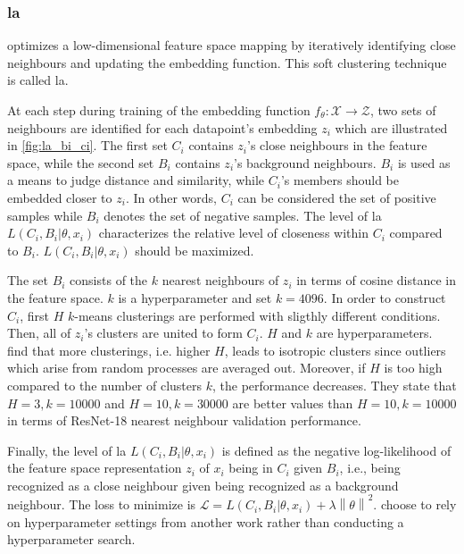 \subsubsection{\acl{la}}\label{subsec:local_aggregation}


\citet{local_aggr_2019} optimizes a low-dimensional feature space mapping by 
iteratively identifying close neighbours and updating the embedding function.
This soft clustering technique is called \ac{la}.

At each step during training of the embedding function $f_\theta: \mathcal{X} \rightarrow \mathcal{Z}$, 
two sets of neighbours are identified for each datapoint's embedding $z_i$ 
which are illustrated in \autoref{fig:la_bi_ci}.
The first set $C_i$ contains $z_i$'s close neighbours in the feature space, while
the second set $B_i$ contains $z_i$'s background neighbours.
$B_i$ is used as a means to judge distance and similarity, 
while $C_i$'s members should be embedded closer to $z_i$.
In other words, $C_i$ can be considered the set of positive samples while 
$B_i$ denotes the set of negative samples.
The level of \ac{la} $L(C_i,B_i | \theta, x_i)$ 
characterizes the relative level of closeness within $C_i$ compared to $B_i$.
$L(C_i,B_i | \theta, x_i)$ should be maximized.

The set $B_i$ consists of the $k$ nearest neighbours of $z_i$ in terms of cosine distance 
in the feature space.
$k$ is a hyperparameter and \citet{local_aggr_2019} set $k=4096$.
In order to construct $C_i$, 
first $H$ $k$-means clusterings are performed with sligthly different conditions.
Then, all of $z_i$'s clusters are united to form $C_i$.
$H$ and $k$ are hyperparameters.
\citet{local_aggr_2019} find that more clusterings, i.e. higher $H$, leads to isotropic clusters since outliers which arise from random processes are averaged out.
Moreover, if $H$ is too high compared to the number of clusters $k$, the performance decreases.
They state that $H=3, k=10000$ and $H=10, k=30000$ are better values than $H=10, k=10000$ 
in terms of ResNet-18 nearest neighbour validation performance.

Finally, the level of \ac{la} $L(C_i,B_i | \theta, x_i)$ is defined as the negative log-likelihood 
of the feature space representation $z_i$ of $x_i$ being in $C_i$ given $B_i$, 
i.e., being recognized as a close neighbour given being recognized as a background neighbour.
The loss to minimize is $\mathcal{L} = L(C_i,B_i | \theta, x_i) + \lambda \left\| \theta \right\|^2$.
\citet{local_aggr_2019} choose to rely on hyperparameter settings from another work rather than conducting a hyperparameter search.


